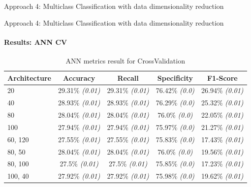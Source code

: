 \documentclass[9pt, pstricks, xcolor=dvipsnames]{beamer}
\begin{document}
\begin{frame}{Approach 4: Multiclass Classification with data dimensionality reduction}

\end{frame}
\begin{frame}{Approach 4: Multiclass Classification with data dimensionality reduction}
\framesubtitle{Results: ANN CV}

\begin{table}[H]
\centering
\begin{tabular}{lcccc}
\toprule
Architecture & Accuracy & Recall & Specificity & F1-Score \\\midrule
20 & 29.31\% \textit{(0.01)} & 29.31\% \textit{(0.01)} & 76.42\% \textit{(0.0)} & 26.94\% \textit{(0.01)} \\
40 & 28.93\% \textit{(0.01)} & 28.93\% \textit{(0.01)} & 76.29\% \textit{(0.0)} & 25.32\% \textit{(0.01)} \\
80 & 28.04\% \textit{(0.01)} & 28.04\% \textit{(0.01)} & 76.0\% \textit{(0.0)} & 22.05\% \textit{(0.01)} \\
100 & 27.94\% \textit{(0.01)} & 27.94\% \textit{(0.01)} & 75.97\% \textit{(0.0)} & 21.27\% \textit{(0.01)} \\
60, 120 & 27.55\% \textit{(0.01)} & 27.55\% \textit{(0.01)} & 75.83\% \textit{(0.0)} & 17.43\% \textit{(0.01)} \\
80, 50 & 28.04\% \textit{(0.01)} & 28.04\% \textit{(0.01)} & 76.0\% \textit{(0.0)} & 19.56\% \textit{(0.01)} \\
80, 100 & 27.5\% \textit{(0.01)} & 27.5\% \textit{(0.01)} & 75.85\% \textit{(0.0)} & 17.23\% \textit{(0.01)} \\
100, 40 & 27.92\% \textit{(0.01)} & 27.92\% \textit{(0.01)} & 75.98\% \textit{(0.0)} & 19.62\% \textit{(0.01)} \\


\bottomrule
\end{tabular}
\caption{ANN metrics result for CrossValidation}
\label{tab:ann_CV_approach4}
\end{table}

\end{frame}
\end{document}
